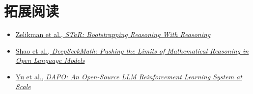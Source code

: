 \section{拓展阅读}

\begin{itemize}
    \item \href{https://arxiv.org/abs/2203.14465}{Zelikman et al., \emph{STaR: Bootstrapping Reasoning With Reasoning}}
    \item \href{https://arxiv.org/abs/2402.03300}{Shao et al., \emph{DeepSeekMath: Pushing the Limits of Mathematical Reasoning in Open Language Models}}
    \item \href{https://arxiv.org/abs/2503.14476}{Yu et al., \emph{DAPO: An Open-Source LLM Reinforcement Learning System at Scale}}
\end{itemize}

